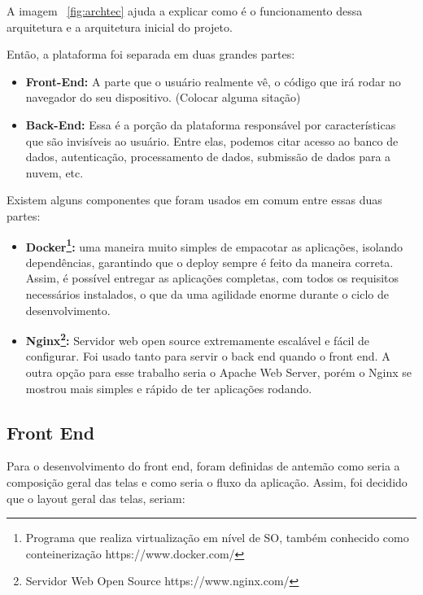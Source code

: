 \documentclass[11pt,twoside]{article}
\begin{document}
A imagem ~\ref{fig:archtec} ajuda a explicar como é o funcionamento dessa arquitetura e a arquitetura inicial do projeto.

Então, a plataforma foi separada em duas grandes partes:

\begin{itemize}
  \item \textbf{Front-End:} A parte que o usuário realmente vê, o código que irá rodar no navegador do seu dispositivo. (Colocar alguma sitação)
  \item \textbf{Back-End:} Essa é a porção da plataforma responsável por características que são invisíveis ao usuário. Entre elas, podemos citar acesso ao banco de dados, autenticação, processamento de dados,
  submissão de dados para a nuvem, etc.
\end{itemize}

Existem alguns componentes que foram usados em comum entre essas duas partes:

\begin{itemize}
  \item \textbf{Docker\footnote{Programa que realiza virtualização em nível de SO, também conhecido como conteinerização https://www.docker.com/}:} 
  uma maneira muito simples de empacotar as aplicações, isolando dependências, garantindo que o deploy sempre é feito da maneira correta. Assim, é possível entregar as aplicações completas, com
  todos os requisitos necessários instalados, o que da uma agilidade enorme durante o ciclo de desenvolvimento.
  \item \textbf{Nginx\footnote{Servidor Web Open Source https://www.nginx.com/}:} Servidor web open source extremamente escalável e fácil de configurar. Foi usado tanto para servir o back end quando o front end. A outra opção para esse trabalho seria o Apache Web Server, porém
  o Nginx se mostrou mais simples e rápido de ter aplicações rodando.
\end{itemize}

\subsection{Front End}

Para o desenvolvimento do front end, foram definidas de antemão como seria a composição geral das telas e como seria o fluxo da aplicação. Assim, foi decidido que o layout geral das telas, seriam:
\end{document}
